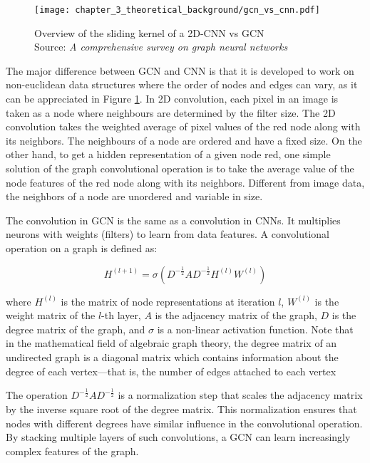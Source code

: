 \begin{figure}[h]
	\centering
	\texttt{[image: chapter\_3\_theoretical\_background/gcn\_vs\_cnn.pdf]}
	\caption[Overview of the sliding kernel of a 2D-CNN vs GCN]{Overview of the sliding kernel of a 2D-CNN vs GCN \\ 
	Source: \textit{A comprehensive survey on graph neural networks} \cite{wu2020comprehensive}}
	\label{fig:chapter_3_theoretical_background/gcn_vs_cnn}
\end{figure}

The major difference between GCN and CNN is that it is developed to work on non-euclidean data structures where the order of nodes and edges can vary, as it can be appreciated in Figure \ref{fig:chapter_3_theoretical_background/gcn_vs_cnn}. In 2D convolution, each pixel in an image is taken as a node where neighbours are determined by the filter size. The 2D convolution takes the weighted average of pixel values of the red node along with its neighbors. The neighbours of a node are ordered and have a fixed size. On the other hand, to get a hidden representation of a given node red, one simple solution of the graph convolutional operation is to take the average value of the node features of the red node along with its neighbors. Different from image data, the neighbors of a node are unordered and variable in size.

The convolution in GCN is the same as a convolution in \acp{CNN}. It multiplies neurons with weights (filters) to learn from data features. A convolutional operation on a graph is defined as:

\begin{equation}
H^{(l+1)} = \sigma(D^{-\frac{1}{2}} A D^{-\frac{1}{2}} H^{(l)} W^{(l)})
\end{equation}

where $H^{(l)}$ is the matrix of node representations at iteration $l$, $W^{(l)}$ is the weight matrix of the $l$-th layer, $A$ is the adjacency matrix of the graph, $D$ is the degree matrix of the graph, and $\sigma$ is a non-linear activation function. Note that in the mathematical field of algebraic graph theory, the degree matrix of an undirected graph is a diagonal matrix which contains information about the degree of each vertex—that is, the number of edges attached to each vertex

The operation $D^{-\frac{1}{2}} A D^{-\frac{1}{2}}$ is a normalization step that scales the adjacency matrix by the inverse square root of the degree matrix. This normalization ensures that nodes with different degrees have similar influence in the convolutional operation. By stacking multiple layers of such convolutions, a GCN can learn increasingly complex features of the graph.

